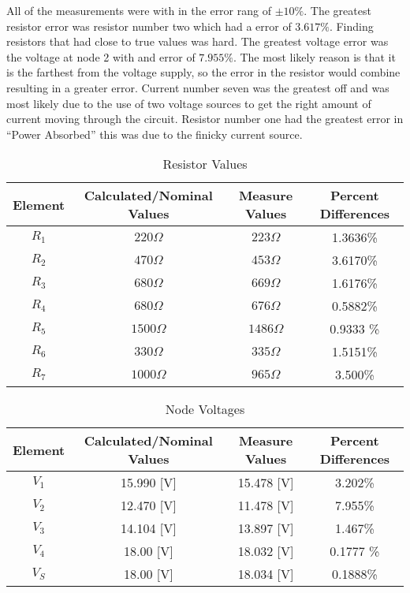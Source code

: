 \documentclass{article}
\begin{document}
All of the measurements were with in the error rang of $\pm 10\%$. The greatest resistor error was resistor number two which had a error of $3.617\%$. Finding resistors that had close to true values was hard. The greatest voltage error was the voltage at node 2 with and error of $7.955\%$. The most likely reason is that it is the farthest from the voltage supply, so the error in the resistor would combine resulting in a greater error. Current number seven was the greatest off and was most likely due to the use of two voltage sources to get the right amount of current moving through the circuit. Resistor number one had the greatest error in ``Power Absorbed'' this was due to the finicky current source. 

\begin{table}[h]
\begin{center}
\label{code:resis}
\caption{Resistor Values}
\begin{tabular}{c|c|c|c}
Element & Calculated/Nominal Values & Measure Values & Percent Differences 
\\\hline
$R_1$ & $220\Omega$ & $223\Omega$ & 1.3636\%  \\
$R_2$ & $470\Omega$ & $453\Omega$ & 3.6170\%  \\
$R_3$ & $680\Omega$ & $669\Omega$ &  1.6176\%  \\
$R_4$ & $680\Omega$ & $676\Omega$ &  0.5882\%  \\
$R_5$ & $1500\Omega$ & $1486\Omega$ & 0.9333 \%  \\
$R_6$ & $330\Omega$ & $335\Omega$ &  1.5151\%  \\
$R_7$ & $1000\Omega$ & $965\Omega$ &  3.500\%  \\


\end{tabular}
\end{center}

\end{table}

\begin{table}[h]
\begin{center}
\label{code:resis}
\caption{Node Voltages}
\begin{tabular}{c|c|c|c}
Element & Calculated/Nominal Values & Measure Values & Percent Differences 
\\\hline
$V_1$ & 15.990 [V] & 15.478 [V] & 3.202\% \\
$V_2$ & 12.470 [V] & 11.478 [V] &  7.955\% \\
$V_3$ & 14.104 [V] & 13.897 [V] &  1.467\% \\
$V_4$ & 18.00   [V] & 18.032 [V] & 0.1777 \% \\
$V_S$ & 18.00   [V] & 18.034 [V] &  0.1888\% \\

\end{tabular}
\end{center}

\end{table}
\end{document}
